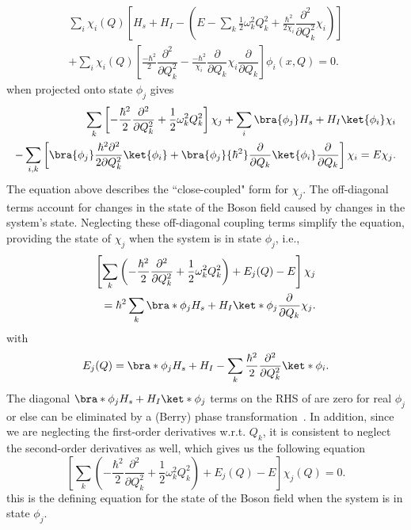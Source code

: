 \begin{align}
    \label{eq:class_jcm_eq4}
   \sum_i \chi_i(Q) \left[H_s + H_I - \left(E - \sum_k
    \frac{1}{2}\omega_k^2 Q_k^2 + \frac{\hbar^2}{2\chi_i}\dfrac{\partial^2}{\partial Q_k^2}
    \chi_i\right) \right]\nonumber \\
    + \sum_i \chi_i(Q) \left[
        \frac{-\hbar^2}{2}\dfrac{\partial^2}{\partial Q_k^2} - 
        \frac{-\hbar^2}{\chi_i}\dfrac{\partial}{\partial Q_k}\chi_i\dfrac{\partial}{\partial Q_k}
    \right]\phi_i (x, Q) = 0.
\end{align}
 when projected onto state \(\phi_j\) gives
\begin{align}
    \label{eq:class_jcm_eq5}
    \sum_k \left[-\frac{\hbar^2}{2}\dfrac{\partial^2}{\partial Q_k^2}
     + \frac{1}{2} \omega_k^2 Q_k^2 \right]\chi_j
    + \sum_i \bra{\phi_j}H_s + H_I\ket{\phi_i}\chi_i \nonumber \\
   - \sum_{i, k} \left[
    \bra{\phi_j}\frac{\hbar^2 \partial^2}{2 \partial Q_k^2}\ket{\phi_i}
    + \bra{\phi_j}{\hbar^2}\dfrac{\partial}{\partial Q_k}\ket{\phi_i}\dfrac{\partial}{\partial Q_k}
   \right]\chi_i = E \chi_j.
\end{align}
The equation above describes the ``close-coupled" form for \(\chi_j\). 
The off-diagonal terms account for changes in the state of the Boson field caused by changes in the system's state. Neglecting these 
off-diagonal coupling terms simplify the equation, providing 
the state of \(\chi_j\) when the system is in state \(\phi_j\), i.e., 
\begin{equation}
    \begin{aligned}
        \label{eq:class_jcm_eq6}
    \left[\sum_k \left(-\frac{\hbar^2}{2}\dfrac{\partial^2}{\partial Q_k^2}
    + \frac{1}{2} \omega_k^2 Q_k^2\right)
    + E_j(Q) - E \right]\chi_j \\
    = \hbar^2 \sum_k \bra*{\phi_j}H_s + H_I \ket*{\phi_j}\dfrac{\partial}{\partial Q_k}\chi_j.
    \end{aligned}
\end{equation}
with 
\begin{eqnarray}
    E_j(Q) = \bra*{\phi_j}H_s + H_I - \sum_k \frac{\hbar^2}{2} \dfrac{\partial^2}{\partial Q_k^2} \ket*{\phi_i}.
\end{eqnarray}
The diagonal \(\bra*{\phi_j}H_s + H_I \ket*{\phi_j}\) terms on the RHS of 
are zero for real \(\phi_j\) or else can be eliminated by a (Berry) phase transformation~\cite{braun2004classical}.
In addition, since we are neglecting the first-order derivatives w.r.t. $Q_k$, it is consistent to neglect
the second-order derivatives as well, which gives us the following equation
\begin{equation}
    \label{eq:class_jcm_eq7}
    \left[\sum_k \left(-\frac{\hbar^2}{2}\dfrac{\partial^2}{\partial Q_k^2}
    + \frac{1}{2} \omega_k^2 Q_k^2\right)
    + E_j(Q) - E \right]\chi_j (Q)= 0.
\end{equation}
this is the defining equation for the state of the Boson field when the system is in state \(\phi_j\).

